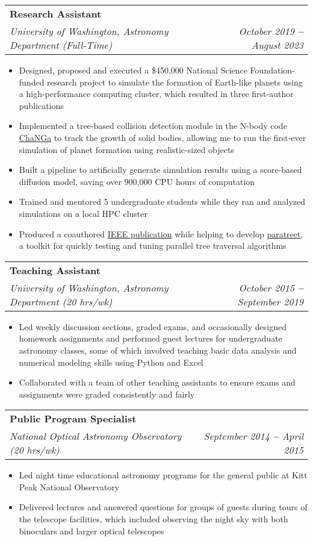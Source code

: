 \documentclass[letterpaper,11pt]{article}
\makeatletter
\newcommand{\resumeItem}[1]{
  \item\small{
    {#1 \vspace{-2pt}}
  }
}
\newcommand{\resumeSubheading}[4]{
  \vspace{-2pt}\item
    \begin{tabular*}{0.97\textwidth}[t]{l@{\extracolsep{\fill}}r}
      \textbf{#1} & #2 \\
      \textit{\small#3} & \textit{\small #4} \\
    \end{tabular*}\vspace{-7pt}
}
\newcommand{\resumeItemListStart}{\begin{itemize}}
\newcommand{\resumeItemListEnd}{\end{itemize}\vspace{-5pt}}
\makeatother
\begin{document}
     \resumeSubheading
      {Research Assistant}{}
      {University of Washington, Astronomy Department (Full-Time)}{October 2019 \textbf{--} August 2023}
        \resumeItemListStart
        	   \resumeItem{Designed, proposed and executed a \$450,000 National Science Foundation-funded research project to simulate the formation of Earth-like planets using a high-performance computing cluster, which resulted in three first-author publications}
	   \resumeItem{Implemented a tree-based collision detection module in the N-body code  {\sc \href{https://github.com/N-BodyShop/changa}{ChaNGa}} to track the growth of solid bodies, allowing me to run the first-ever simulation of planet formation using realistic-sized objects}
	   \resumeItem{Built a pipeline to artificially generate simulation results using a score-based diffusion model, saving over 900,000 CPU hours of computation}
	   \resumeItem{Trained and mentored 5 undergraduate students while they ran and analyzed simulations on a local HPC cluster}
	   \resumeItem{Produced a coauthored \href{https://doi.org/10.1109/IPDPS53621.2022.00079}{IEEE publication} while helping to develop {\sc \href{https://paratreet.github.io/}{paratreet}}, a toolkit for quickly testing and tuning parallel tree traversal algorithms}
        \resumeItemListEnd
        
       \resumeSubheading
      {Teaching Assistant}{}
      {University of Washington, Astronomy Department (20 hrs/wk)}{October 2015 \textbf{--} September 2019}
        \resumeItemListStart
        	   \resumeItem{Led weekly discussion sections, graded exams, and occasionally designed homework assignments and performed guest lectures for undergraduate astronomy classes, some of which involved teaching basic data analysis and numerical modeling skills using Python and Excel}
	   \resumeItem{Collaborated with a team of other teaching assistants to ensure exams and assignments were graded consistently and fairly}
        \resumeItemListEnd
        
       \resumeSubheading
      {Public Program Specialist}{}
      {National Optical Astronomy Observatory (20 hrs/wk)}{September 2014 \textbf{--} April 2015}
        \resumeItemListStart
        	   \resumeItem{Led night time educational astronomy programs for the general public at Kitt Peak National Observatory}
	   \resumeItem{Delivered lectures and answered questions for groups of guests during tours of the telescope facilities, which included observing the night sky with both binoculars and larger optical telescopes}
        \resumeItemListEnd
        
\end{document}
